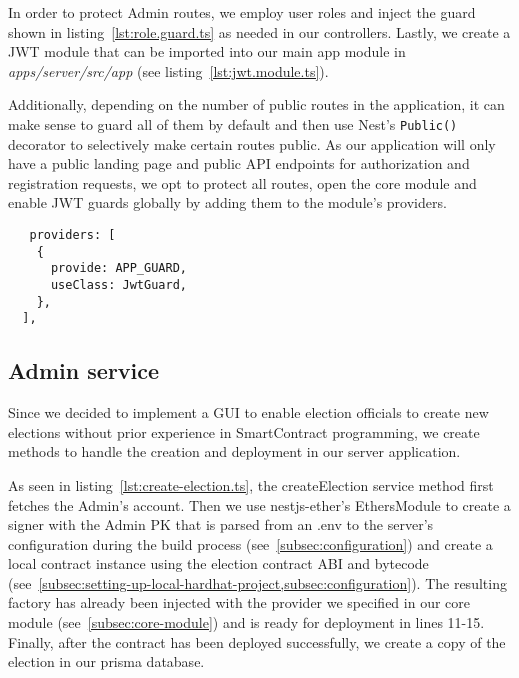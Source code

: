 
In order to protect \gls{Admin} routes, we employ user roles and inject the guard shown in listing~\ref{lst:role.guard.ts} as needed in our controllers.
Lastly, we create a \gls{JWT} module that can be imported into our main app module in \emph{apps/server/src/app} (see listing~\ref{lst:jwt.module.ts}).


Additionally, depending on the number of public routes in the application, it can make sense to guard all of them by default and then use Nest's \texttt{Public()} decorator to selectively make certain routes public.
As our application will only have a public landing page and public \gls{API} endpoints for authorization and registration requests, we opt to protect all routes, open the core module and enable \gls{JWT} guards globally by adding them to the module's providers.

\begin{verbatim}
   providers: [
    {
      provide: APP_GUARD,
      useClass: JwtGuard,
    },
  ],
\end{verbatim}

\subsection{Admin service}\label{subsec:admin-service}

Since we decided to implement a \gls{GUI} to enable election officials to create new elections without prior experience in \gls{SmartContract} programming, we create methods to handle the creation and deployment in our server application.

As seen in listing~\ref{lst:create-election.ts}, the createElection service method first fetches the \gls{Admin}'s account.
Then we use nestjs-ether's EthersModule to create a signer with the \gls{Admin} \gls{PK} that is parsed from an .env to the server's configuration during the build process (see~\cref{subsec:configuration}) and create a local contract instance using the election contract \gls{ABI} and bytecode (see~\cref{subsec:setting-up-local-hardhat-project,subsec:configuration}).
The resulting factory has already been injected with the provider we specified in our core module (see~\cref{subsec:core-module}) and is ready for deployment in lines 11-15.
Finally, after the contract has been deployed successfully, we create a copy of the election in our prisma database.

